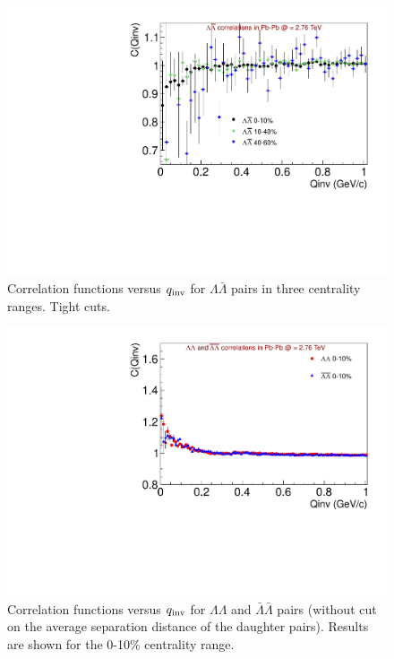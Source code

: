 \begin{figure}[hbtp]
\includegraphics[scale=0.7]{Mix_Tight_cuts_ANote.pdf}
\caption{Correlation functions versus $q_{\rm inv}$ for $\Lambda\bar{\Lambda}$ pairs in three centrality ranges. Tight cuts.}
\label{fig:CFTightCutsMix}
\end{figure}

\begin{figure}[hbtp]
\includegraphics[scale=0.7]{CFs_noMergeCut_note.pdf}
\caption[Correlation functions versus $q_{\rm inv}$ for $\Lambda\Lambda$ and $\bar{\Lambda}\bar{\Lambda}$ pairs. No merging cuts]{Correlation functions versus $q_{\rm inv}$ for $\Lambda\Lambda$ and $\bar{\Lambda}\bar{\Lambda}$ pairs (without cut on the average separation distance of the daughter pairs).  Results are shown for the 0-10\% centrality range.}
\label{fig:CFNoMerge}
\end{figure}

